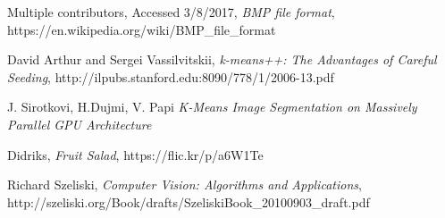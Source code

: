 \documentclass[11pt]{article}
\begin{document}
\begin{thebibliography}{9}

  Multiple contributors,
  Accessed 3/8/2017,
  \emph{BMP file format},
  https://en.wikipedia.org/wiki/BMP\_file\_format

  David Arthur and Sergei Vassilvitskii,
  \emph{k-means++: The Advantages of Careful Seeding},
  http://ilpubs.stanford.edu:8090/778/1/2006-13.pdf

  J. Sirotkovi, H.Dujmi, V. Papi
  \emph{K-Means Image Segmentation on Massively Parallel GPU Architecture}

  Didriks,
  \emph{Fruit Salad},
  https://flic.kr/p/a6W1Te

  Richard Szeliski,
  \emph{Computer Vision: Algorithms and Applications},
  http://szeliski.org/Book/drafts/SzeliskiBook\_20100903\_draft.pdf


\end{thebibliography}
\end{document}
